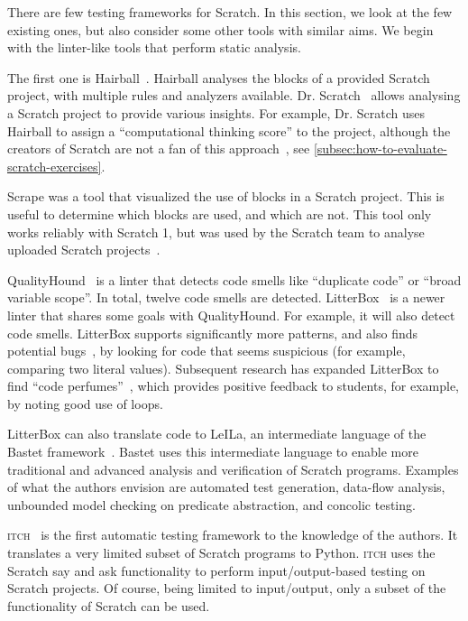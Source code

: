\documentclass[../main]{subfiles}
\begin{document}
There are few testing frameworks for Scratch.
In this section, we look at the few existing ones, but also consider some other tools with similar aims.
We begin with the linter-like tools that perform static analysis.

The first one is Hairball~\autocite{boeHairballLintinspiredStatic2013}.
Hairball analyses the blocks of a provided Scratch project, with multiple rules and analyzers available.
Dr. Scratch~\autocite{moreno-leonDrScratchWeb2015} allows analysing a Scratch project to provide various insights.
For example, Dr. Scratch uses Hairball to assign a ``computational thinking score'' to the project, although the creators of Scratch are not a fan of this approach~\autocite{resnickCodingCrossroads2020}, see \cref{subsec:how-to-evaluate-scratch-exercises}.

Scrape was a tool that visualized the use of blocks in a Scratch project.
This is useful to determine which blocks are used, and which are not.
This tool only works reliably with Scratch 1, but was used by the Scratch team to analyse uploaded Scratch projects~\autocite{brennan2012new}.

QualityHound~\autocite{techapalokulQualityHoundOnline2017} is a linter that detects code smells like ``duplicate code'' or ``broad variable scope''.
In total, twelve code smells are detected.
LitterBox~\autocite{fraserLitterBoxLinterScratch2021} is a newer linter that shares some goals with QualityHound.
For example, it will also detect code smells.
LitterBox supports significantly more patterns, and also finds potential bugs~\autocite{fradrichCommonBugsScratch2020}, by looking for code that seems suspicious (for example, comparing two literal values).
Subsequent research has expanded LitterBox to find ``code perfumes''~\autocite{obermullerCodePerfumesReporting2021}, which provides positive feedback to students, for example, by noting good use of loops.

LitterBox can also translate code to LeILa, an intermediate language of the Bastet framework~\autocite{stahlbauerVerifiedScratchProgram2020}.
Bastet uses this intermediate language to enable more traditional and advanced analysis and verification of Scratch programs.
Examples of what the authors envision are automated test generation, data-flow analysis, unbounded model checking on predicate abstraction, and concolic testing.

\textsc{itch}~\autocite{johnsonITCHIndividualTesting2016} is the first automatic testing framework to the knowledge of the authors.
It translates a very limited subset of Scratch programs to Python.
\textsc{itch} uses the Scratch say and ask functionality to perform input/output-based testing on Scratch projects.
Of course, being limited to input/output, only a subset of the functionality of Scratch can be used.
\end{document}
